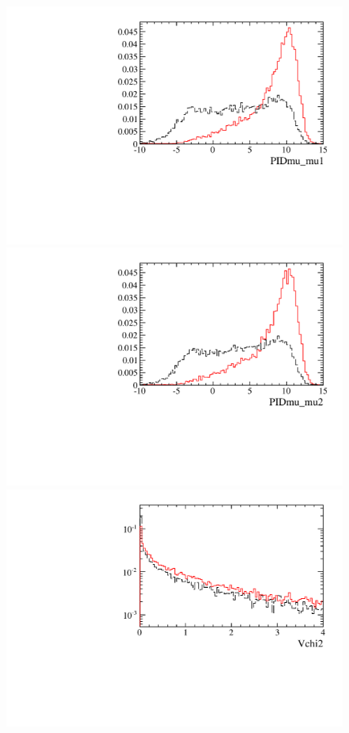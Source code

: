 \begin{figure} [htb!]
\begin{center}
\includegraphics[scale=0.20]{figs/PIDmu_mu1FULL.pdf}
\includegraphics[scale=0.20]{figs/PIDmu_mu2FULL.pdf}
\includegraphics[scale=0.20]{figs/Vchi2FULL.pdf}

\end{center}
\end{figure}
